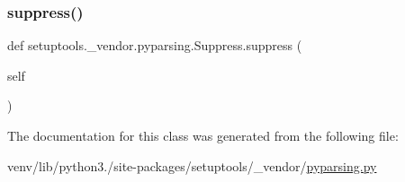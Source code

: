 \subsubsection{\texorpdfstring{suppress()}{suppress()}}
{\footnotesize\ttfamily def setuptools.\+\_\+vendor.\+pyparsing.\+Suppress.\+suppress (\begin{DoxyParamCaption}\item[{}]{self }\end{DoxyParamCaption})}



The documentation for this class was generated from the following file\+:\begin{DoxyCompactItemize}
\item 
venv/lib/python3./site-\/packages/setuptools/\+\_\+vendor/\hyperlink{setuptools_2__vendor_2pyparsing_8py}{pyparsing.\+py}\end{DoxyCompactItemize}
